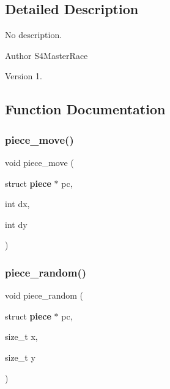 \subsection{Detailed Description}
No description. 

\begin{DoxyAuthor}{Author}
S4\+Master\+Race 
\end{DoxyAuthor}
\begin{DoxyVersion}{Version}
1. 
\end{DoxyVersion}


\subsection{Function Documentation}
\mbox{\label{piece_8c_a4642eff00c1b15fd507057c44e6736a0}} 
\subsubsection{piece\+\_\+move()}
{\footnotesize\ttfamily void piece\+\_\+move (\begin{DoxyParamCaption}\item[{struct \textbf{ piece} $\ast$}]{pc,  }\item[{int}]{dx,  }\item[{int}]{dy }\end{DoxyParamCaption})\hspace{0.3cm}{\ttfamily [inline]}}

\mbox{\label{piece_8c_af5ed528ee08179282cc95a5431aba453}} 
\subsubsection{piece\+\_\+random()}
{\footnotesize\ttfamily void piece\+\_\+random (\begin{DoxyParamCaption}\item[{struct \textbf{ piece} $\ast$}]{pc,  }\item[{size\+\_\+t}]{x,  }\item[{size\+\_\+t}]{y }\end{DoxyParamCaption})\hspace{0.3cm}{\ttfamily [inline]}}

\mbox{\label{piece_8c_af73ec0a224e50fee25089a256145bbd2}} 
